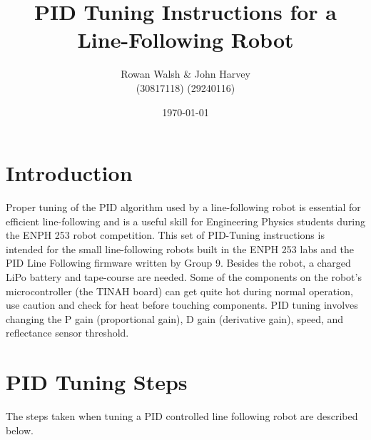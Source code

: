 \documentclass[11pt]{article}
\begin{document}
\title{PID Tuning Instructions for a Line-Following Robot}
\author{Rowan Walsh \& John Harvey \\ (30817118) (29240116)}
\date{\today}

\maketitle
\doublespacing

\section{Introduction}

Proper tuning of the PID algorithm used by a line-following robot is essential for efficient line-following and is a useful skill for Engineering Physics students during the ENPH 253 robot competition.  This set of PID-Tuning instructions is intended for the small line-following robots built in the ENPH 253 labs and the PID Line Following firmware written by Group 9.  Besides the robot, a charged LiPo battery and tape-course are needed.  Some of the components on the robot's microcontroller (the TINAH board) can get quite hot during normal operation, use caution and check for heat before touching components.  PID tuning involves changing the P gain (proportional gain), D gain (derivative gain), speed, and reflectance sensor threshold.

\section{PID Tuning Steps}

The steps taken when tuning a PID controlled line following robot are described below.
\end{document}
